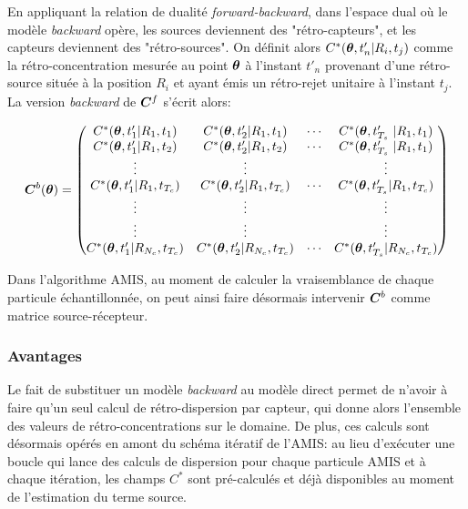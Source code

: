 En appliquant la relation de dualité \textit{forward-backward}, dans l'espace dual où le modèle \textit{backward} opère, les sources deviennent des "rétro-capteurs", et les capteurs deviennent des "rétro-sources". On définit alors $C^*({\bm{\theta}},t'_n | R_i, t_j)$ comme la rétro-concentration mesurée au point ${\bm{\theta}}$ à l'instant $t'_n$ provenant d'une rétro-source située à la position $R_i$ et ayant émis un rétro-rejet unitaire à l'instant $t_j$. La version \textit{backward} de ${\bm{C}}^f$ s'écrit alors:

\begin{equation}
\MatC^b (\VecTheta)= 
\begin{pmatrix}
	C^*(\VecTheta, t'_1 | R_1, t_1) & C^*(\VecTheta, t'_2 | R_1, t_1) & \cdots & C^*(\VecTheta, t'_{T_s} | R_1, t_1) \\
	C^*(\VecTheta, t'_1 | R_1, t_2) & C^*(\VecTheta, t'_2 | R_1, t_2) & \cdots & C^*(\VecTheta, t'_{T_s} | R_1, t_1) \\
	\vdots & \vdots & & \vdots \\
	C^*(\VecTheta, t'_1| R_1,t_{T_c}) & C^*(\VecTheta, t'_2 | R_1, t_{T_c}) & \cdots & C^*(\VecTheta, t'_{T_s} | R_1, t_{T_c}) \\ 
	\vdots & \vdots & & \vdots \\
	\vdots & \vdots & & \vdots \\
	C^*(\VecTheta, t'_1| R_{N_c},t_{T_c}) & C^*(\VecTheta, t'_2 | R_{N_c}, t_{T_c}) & \cdots & C^*(\VecTheta, t'_{T_s} | R_{N_c}, t_{T_c}) \\ 
	
\end{pmatrix}
\label{eq_matrix_backward}
\end{equation}

Dans l'algorithme AMIS, au moment de calculer la vraisemblance de chaque particule échantillonnée, on peut ainsi faire désormais intervenir ${\bm{C}}^b$ comme matrice source-récepteur.

\subsubsection{Avantages}

Le fait de substituer un modèle \textit{backward} au modèle direct permet de n'avoir à faire qu'un seul calcul de rétro-dispersion par capteur, qui donne alors l'ensemble des valeurs de rétro-concentrations sur le domaine. De plus, ces calculs sont désormais opérés en amont du schéma itératif de l'AMIS: au lieu d'exécuter une boucle qui lance des calculs de dispersion pour chaque particule AMIS et à chaque itération, les champs $C^*$ sont pré-calculés et déjà disponibles au moment de l'estimation du terme source. \\

